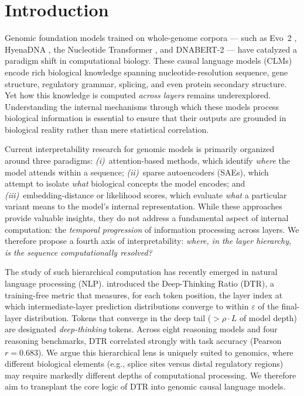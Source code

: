 \documentclass{article}
\theoremstyle{plain}
\theoremstyle{definition}
\theoremstyle{remark}
\newcommand{\DTR}{\textsc{DTR}}
\begin{document}
\section{Introduction}
\label{sec:intro}

Genomic foundation models trained on whole-genome corpora --- such as
Evo~2 \cite{nguyen2026evo2}, HyenaDNA \cite{nguyen2023hyenadna},
the Nucleotide Transformer \cite{dallatorre2024nt}, and DNABERT-2
\cite{zhou2024dnabert2} --- have catalyzed a paradigm shift in
computational biology. These causal language models (CLMs) encode
rich biological knowledge spanning nucleotide-resolution sequence,
gene structure, regulatory grammar, splicing, and even protein
secondary structure. Yet how this knowledge is computed
\emph{across layers} remains underexplored. Understanding the internal
mechanisms through which these models process biological information is
essential to ensure that their outputs are grounded in biological
reality rather than mere statistical correlation.

Current interpretability research for genomic models is primarily
organized around three paradigms: \emph{(i)}~attention-based methods,
which identify \emph{where} the model attends within a sequence;
\emph{(ii)}~sparse autoencoders (SAEs), which attempt to isolate
\emph{what} biological concepts the model encodes; and
\emph{(iii)}~embedding-distance or likelihood scores, which evaluate
\emph{what} a particular variant means to the model's internal
representation. While these approaches provide valuable insights, they
do not address a fundamental aspect of internal computation:
the \emph{temporal progression} of information processing across
layers. We therefore propose a fourth axis of interpretability:
\emph{where, in the layer hierarchy, is the sequence computationally
resolved?}

The study of such hierarchical computation has recently emerged in
natural language processing (NLP). \citet{chen2026deepthinking}
introduced the Deep-Thinking Ratio (\DTR{}), a training-free metric
that measures, for each token position, the layer index at which
intermediate-layer prediction distributions converge to within
$\varepsilon$ of the final-layer distribution. Tokens that converge in
the deep tail ($> \rho \cdot L$ of model depth) are designated
\emph{deep-thinking} tokens. Across eight reasoning models and four
reasoning benchmarks, \DTR{} correlated strongly with task accuracy
(Pearson $r = 0.683$). We argue this hierarchical lens is uniquely
suited to genomics, where different biological elements (e.g., splice
sites versus distal regulatory regions) may require markedly different
depths of computational processing. We therefore aim to transplant the
core logic of \DTR{} into genomic causal language models.
\end{document}
